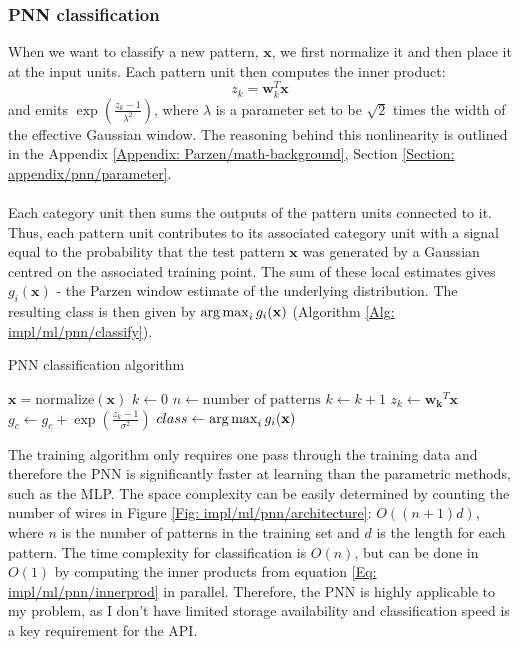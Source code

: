 	\subsubsection*{PNN classification}
	When we want to classify a new pattern, $\mathbf{x}$, we first normalize it and then place it at the input units. Each pattern unit then computes the inner product:
	\begin{equation}
		z_k = \mathbf{w}_k^T \mathbf{x}
		\label{Eq: impl/ml/pnn/innerprod}
	\end{equation}   
	and emits $\exp(\frac{z_k-1}{\lambda^2})$, where $\lambda$ is a parameter set to be $\sqrt{2}$ times the width of the effective Gaussian window. The reasoning behind this nonlinearity is outlined in the Appendix \ref{Appendix: Parzen/math-background}, Section \ref{Section: appendix/pnn/parameter}.
	\\ \\
	Each category unit then sums the outputs of the pattern units connected to it. Thus, each pattern unit contributes to its associated category unit with a signal equal to the probability that the test pattern $\mathbf{x}$ was generated by a Gaussian centred on the associated training point. The sum of these local estimates gives $g_i(\mathbf{x})$ - the Parzen window estimate of the underlying distribution. The resulting class is then given by $\operatorname*{arg\,max}_i g_i(\mathbf{x})$ (Algorithm \ref{Alg: impl/ml/pnn/classify}). 
	\begin{algorithm}[H]
	\caption{PNN classification algorithm}
	\label{Alg: impl/ml/pnn/classify}
	\begin{algorithmic}[H]
		\State $\mathbf{x} = \text{normalize}(\mathbf{x})$
		\State $k \gets 0$
		\State $n \gets \text{number of patterns}$ 
			\Do
				\State $k \gets k + 1$
				\State $z_k \gets \mathbf{w_k}^T\mathbf{x}$
					\State $g_c \gets g_c + \exp(\frac{z_k - 1}{\sigma^2})$
				\EndIf
		\State $class \gets \operatorname*{arg\,max}_i g_i(\mathbf{x})$ \\
		\EndProcedure
	\end{algorithmic}
	\end{algorithm}
	The training algorithm only requires one pass through the training data and therefore the PNN is significantly faster at learning than the parametric methods, such as the MLP. The space complexity can be easily determined by counting the number of wires in Figure \ref{Fig: impl/ml/pnn/architecture}: $O((n+1)d)$, where $n$ is the number of patterns in the training set and $d$ is the length for each pattern. The time complexity for classification is $O(n)$, but can be done in $O(1)$ by computing the inner products from equation \ref{Eq: impl/ml/pnn/innerprod} in parallel. Therefore, the PNN is highly applicable to my problem, as I don't have limited storage availability and classification speed is a key requirement for the API. 
	
